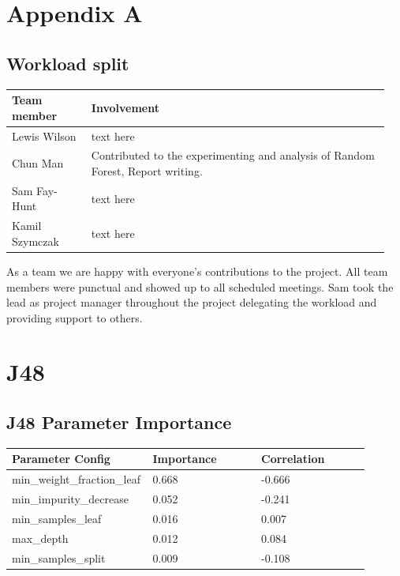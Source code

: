 \documentclass[11pt]{article}
\begin{document}
\pagebreak
\appendix
\appendixpage
\addappheadtotoc
\begin{appendices}

\section{Appendix A}


\subsection{Workload split}
  
  \begin{table}[ht]
    \centering
    \begin{tabular}{|p{0.2\linewidth} | p{0.75\linewidth}|} 
      \hline
      \textbf{Team member}  & \textbf{Involvement} \\ \hline
      Lewis Wilson & text here \\ \hline
      Chun Man & Contributed to the experimenting and analysis of Random Forest, Report writing. \\ \hline
      Sam Fay-Hunt & text here \\ \hline
      Kamil Szymczak & text here \\ \hline
    \end{tabular}
  \end{table}\label{ContributionTab}

As a team we are happy with everyone's contributions to the project. All team members were punctual and showed up to all scheduled meetings. Sam took the lead as project manager throughout the project delegating the workload and providing support to others.


\newpage
\section{J48}

\subsection{J48 Parameter Importance}
  \begin{table}[ht]
    \centering
    \begin{tabular}{|p{0.3\linewidth} | p{0.3\linewidth}| p{0.3\linewidth}|} 
      \hline
      \textbf{Parameter Config}  & \textbf{Importance} & \textbf{Correlation} \\ \hline
        min\_weight\_fraction\_leaf & 0.668  & -0.666 \\ \hline
        min\_impurity\_decrease & 0.052 & -0.241 \\ \hline
        min\_samples\_leaf & 0.016 & 0.007 \\ \hline
        max\_depth & 0.012 & 0.084 \\ \hline
        min\_samples\_split & 0.009 & -0.108 \\ \hline


\end{tabular}
\end{table}
\end{appendices}
\end{document}
